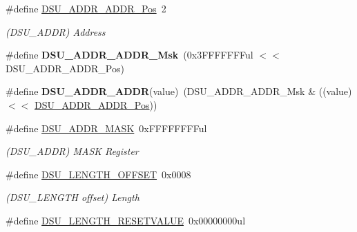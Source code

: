 \begin{DoxyCompactItemize}
\item 
\hypertarget{group___s_a_m_l21___d_s_u_ga028619d29a30f3abc4ff67ce0797952c}{}\#define \hyperlink{group___s_a_m_l21___d_s_u_ga028619d29a30f3abc4ff67ce0797952c}{D\+S\+U\+\_\+\+A\+D\+D\+R\+\_\+\+A\+D\+D\+R\+\_\+\+Pos}~2\label{group___s_a_m_l21___d_s_u_ga028619d29a30f3abc4ff67ce0797952c}

\begin{DoxyCompactList}\small\item\em (D\+S\+U\+\_\+\+A\+D\+D\+R) Address \end{DoxyCompactList}\item 
\hypertarget{group___s_a_m_l21___d_s_u_gabd32d0522daddb84bbf02228c190fc49}{}\#define {\bfseries D\+S\+U\+\_\+\+A\+D\+D\+R\+\_\+\+A\+D\+D\+R\+\_\+\+Msk}~(0x3\+F\+F\+F\+F\+F\+F\+Ful $<$$<$ D\+S\+U\+\_\+\+A\+D\+D\+R\+\_\+\+A\+D\+D\+R\+\_\+\+Pos)\label{group___s_a_m_l21___d_s_u_gabd32d0522daddb84bbf02228c190fc49}

\item 
\hypertarget{group___s_a_m_l21___d_s_u_ga87f4d8a3d868be1f3d8cc880a0b67b65}{}\#define {\bfseries D\+S\+U\+\_\+\+A\+D\+D\+R\+\_\+\+A\+D\+D\+R}(value)~(D\+S\+U\+\_\+\+A\+D\+D\+R\+\_\+\+A\+D\+D\+R\+\_\+\+Msk \& ((value) $<$$<$ \hyperlink{group___s_a_m_l21___d_s_u_ga028619d29a30f3abc4ff67ce0797952c}{D\+S\+U\+\_\+\+A\+D\+D\+R\+\_\+\+A\+D\+D\+R\+\_\+\+Pos}))\label{group___s_a_m_l21___d_s_u_ga87f4d8a3d868be1f3d8cc880a0b67b65}

\item 
\hypertarget{group___s_a_m_l21___d_s_u_gadfb5c4d624bfbe3736315ad712fc3238}{}\#define \hyperlink{group___s_a_m_l21___d_s_u_gadfb5c4d624bfbe3736315ad712fc3238}{D\+S\+U\+\_\+\+A\+D\+D\+R\+\_\+\+M\+A\+S\+K}~0x\+F\+F\+F\+F\+F\+F\+F\+Ful\label{group___s_a_m_l21___d_s_u_gadfb5c4d624bfbe3736315ad712fc3238}

\begin{DoxyCompactList}\small\item\em (D\+S\+U\+\_\+\+A\+D\+D\+R) M\+A\+S\+K Register \end{DoxyCompactList}\item 
\hypertarget{group___s_a_m_l21___d_s_u_gaa51326ede30d0596a90a8758846527b9}{}\#define \hyperlink{group___s_a_m_l21___d_s_u_gaa51326ede30d0596a90a8758846527b9}{D\+S\+U\+\_\+\+L\+E\+N\+G\+T\+H\+\_\+\+O\+F\+F\+S\+E\+T}~0x0008\label{group___s_a_m_l21___d_s_u_gaa51326ede30d0596a90a8758846527b9}

\begin{DoxyCompactList}\small\item\em (D\+S\+U\+\_\+\+L\+E\+N\+G\+T\+H offset) Length \end{DoxyCompactList}\item 
\hypertarget{group___s_a_m_l21___d_s_u_ga055ab4dd190617fd309ed8db03c185ac}{}\#define \hyperlink{group___s_a_m_l21___d_s_u_ga055ab4dd190617fd309ed8db03c185ac}{D\+S\+U\+\_\+\+L\+E\+N\+G\+T\+H\+\_\+\+R\+E\+S\+E\+T\+V\+A\+L\+U\+E}~0x00000000ul\label{group___s_a_m_l21___d_s_u_ga055ab4dd190617fd309ed8db03c185ac}


\end{DoxyCompactItemize}
